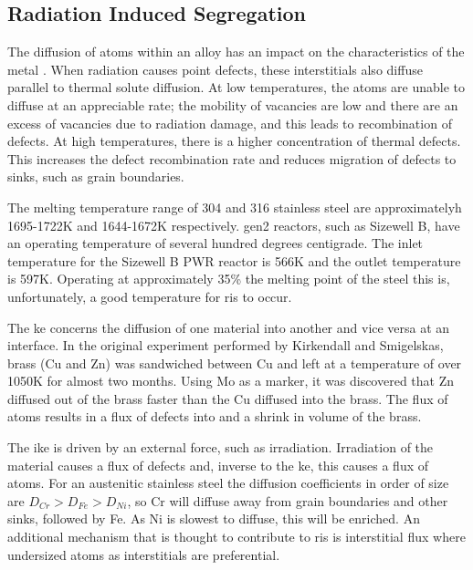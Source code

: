 \FloatBarrier


\subsection{Radiation Induced Segregation}

The diffusion of atoms within an alloy has an impact on the characteristics of the metal \cite{nickeldiffusion}.  When radiation causes point defects, these interstitials also diffuse parallel to thermal solute diffusion.  At low temperatures, the atoms are unable to diffuse at an appreciable rate; the mobility of vacancies are low\cite{gswas} and there are an excess of vacancies due to radiation damage, and this leads to recombination of defects.  At high temperatures, there is a higher concentration of thermal defects\cite{lightwaterallenbusby}.  This increases the defect recombination rate and reduces migration of defects to sinks, such as grain boundaries.

The melting temperature range of 304 and 316 stainless steel are approximatelyh 1695-1722K and 1644-1672K respectively.  \acrshort{gen2} reactors, such as Sizewell B, have an operating temperature of several hundred degrees centigrade.  The inlet temperature for the Sizewell B PWR reactor is 566K\cite{sizewellbtemp} and the outlet temperature is 597K\cite{sizewellbtemp}.  Operating at approximately 35\% the melting point of the steel this is, unfortunately, a good temperature for \acrfull{ris} to occur.

The \acrfull{ke} concerns the diffusion of one material into another and vice versa at an interface.  In the original experiment performed by Kirkendall and Smigelskas, brass (\Gls{Cu} and Zn) was sandwiched between \Gls{Cu} and left at a temperature of over 1050K for almost two months.  Using \Gls{Mo} as a marker, it was discovered that \Gls{Zn} diffused out of the brass faster than the \Gls{Cu} diffused into the brass.  The flux of atoms results in a flux of defects into and a shrink in volume of the brass\cite{gswasike}.

The \acrfull{ike} is driven by an external force, such as irradiation.  Irradiation of the material causes a flux of defects and, inverse to the \acrshort{ke}, this causes a flux of atoms.  For an austenitic stainless steel the diffusion coefficients in order of size are $D_{Cr} > D_{Fe} > D_{Ni}$\cite{risfecrni}, so Cr will diffuse away from grain boundaries and other sinks, followed by Fe.  As Ni is slowest to diffuse, this will be enriched.  An additional mechanism that is thought to contribute to \acrshort{ris} is interstitial flux where undersized atoms as interstitials are preferential\cite{risfecrni}.

